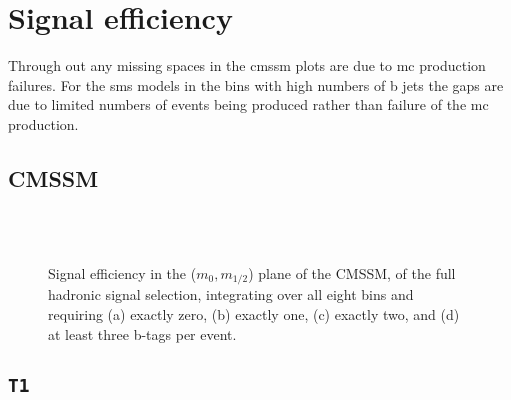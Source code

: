 \newpage
\chapter{Signal efficiency\label{app:sig-eff}}
Through out any missing spaces in the \ac{cmssm} plots are due to \ac{mc} production failures. For the \ac{sms} models in the bins with high numbers of b jets the gaps are due to limited numbers of events being produced rather than failure of the \ac{mc} production.
\section{CMSSM\label{app:sig-eff-cmssm}}

\begin{figure}[h!]
  \begin{center}
     \\
     \\
    \caption{\label{fig:sig-eff-cmssm}Signal efficiency in the
      ($m_{0},m_{1/2}$) plane of the CMSSM, of the full hadronic
      signal selection, integrating over all eight \HT bins and
      requiring (a) exactly zero, (b) exactly one, (c) exactly two,
      and (d) at least three b-tags per event.}
  \end{center}
\end{figure}

\newpage
\section{\texttt{T1}\label{app:sig-eff-t1}}

